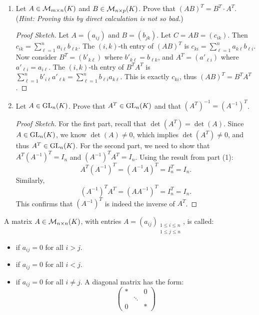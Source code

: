 \begin{exercise}
\begin{enumerate}
    \item Let $A \in \mathcal{M}_{m \times n}(K)$ and $B \in \mathcal{M}_{n \times p}(K)$. Prove that $(AB)^T = B^T \cdot A^T$. \newline (\textit{Hint: Proving this by direct calculation is not so bad.})
    \begin{proof}[Proof Sketch]
    Let $A = (a_{ij})$ and $B = (b_{jk})$. Let $C = AB = (c_{ik})$. Then $c_{ik} = \sum_{\ell=1}^n a_{i\ell} b_{\ell k}$.
    The $(i,k)$-th entry of $(AB)^T$ is $c_{ki} = \sum_{\ell=1}^n a_{k\ell} b_{\ell i}$.
    Now consider $B^T = (b'_{k\ell})$ where $b'_{k\ell} = b_{\ell k}$, and $A^T = (a'_{\ell i})$ where $a'_{\ell i} = a_{i\ell}$.
    The $(i,k)$-th entry of $B^T A^T$ is $\sum_{\ell=1}^n b'_{i\ell} a'_{\ell k} = \sum_{\ell=1}^n b_{\ell i} a_{k\ell}$.
    This is exactly $c_{ki}$, thus $(AB)^T = B^T A^T$.
    \end{proof}
    \item Let $A \in \operatorname{GL}_n(K)$. Prove that $A^T \in \operatorname{GL}_n(K)$ and that $(A^T)^{-1} = (A^{-1})^T$.
    \begin{proof}[Proof Sketch]
    For the first part, recall that $\det(A^T) = \det(A)$. Since $A \in \operatorname{GL}_n(K)$, we know $\det(A) \neq 0$, which implies $\det(A^T) \neq 0$, and thus $A^T \in \operatorname{GL}_n(K)$.
    For the second part, we need to show that $A^T (A^{-1})^T = I_n$ and $(A^{-1})^T A^T = I_n$. Using the result from part (1):
    \[ A^T (A^{-1})^T = (A^{-1}A)^T = I_n^T = I_n. \]
    Similarly,
    \[ (A^{-1})^T A^T = (AA^{-1})^T = I_n^T = I_n. \]
    This confirms that $(A^{-1})^T$ is indeed the inverse of $A^T$.
    \end{proof}
\end{enumerate}
\end{exercise}

\begin{definition}
\label{def:triangular_diagonal_matrices}
A matrix $A \in \mathcal{M}_{n \times n}(K)$, with entries $A = (a_{ij})_{\substack{1 \le i \le n \\ 1 \le j \le n}}$, is called:
\begin{itemize}
    \item {} if $a_{ij} = 0$ for all $i > j$.
    \item {} if $a_{ij} = 0$ for all $i < j$.
    \item {} if $a_{ij} = 0$ for all $i \neq j$. A diagonal matrix has the form:
    \begin{equation*}
        \begin{pmatrix} * & & 0 \\ & \ddots & \\ 0 & & * \end{pmatrix}
    \end{equation*}
\end{itemize}
\end{definition}

